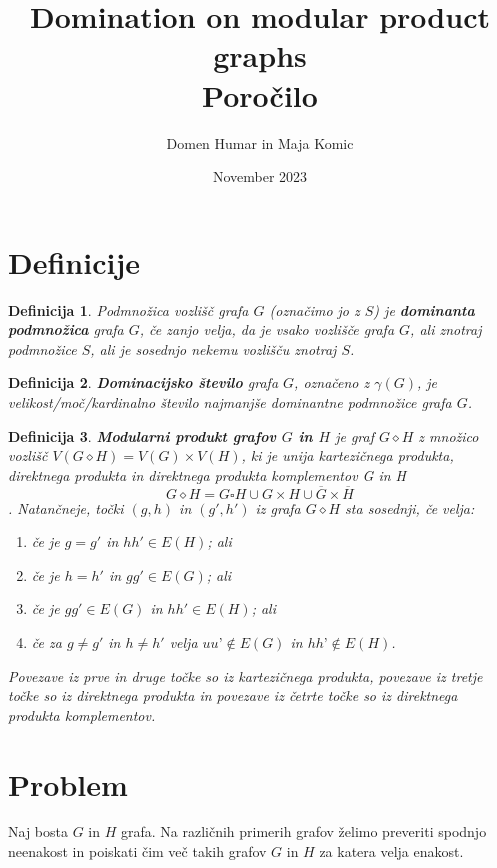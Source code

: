 \documentclass[a4paper,12pt]{article}
\newtheorem{definition}{Definicija}
\begin{document}
\author{Domen Humar in Maja Komic}
\date{November 2023}
\title{
    Domination on modular product graphs \\
    \large Poročilo
    }
\maketitle

\section{Definicije}
\begin{definition}
    Podmnožica vozlišč grafa $G$ (označimo jo z $S$) je \textbf{dominanta podmnožica}
    grafa $G$, če zanjo velja, da je vsako vozlišče grafa $G$, ali znotraj podmnožice $S$,
    ali je sosednjo nekemu vozlišču znotraj $S$.
\end{definition}

\begin{definition}
    \textbf{Dominacijsko število} grafa $G$, označeno z $\gamma(G)$, je velikost/moč/kardinalno število
    najmanjše \emph{dominantne podmnožice} grafa $G$.
\end{definition}

\begin{definition}
    \textbf {Modularni produkt grafov $G$ in $H$} je graf $G\diamond H$ z množico vozlišč $V( G\diamond H) = V(G) \times  V(H)$, ki je 
    unija kartezičnega produkta, direktnega produkta in direktnega produkta komplementov G in H
    $$G \diamond H = G\square H \cup G \times H \cup \overline{G} \times \overline{H} $$.
    Natančneje, točki $(g, h)$ in $(g', h')$ iz grafa $G \diamond H$ sta sosednji, če velja: 
    \begin{enumerate}
        \item če je $g = g'$ in $hh' \in E(H)$; ali 
        \item če je $h = h'$ in $gg' \in E(G)$; ali 
        \item če je $gg' \in E(G)$ in $hh' \in E(H)$; ali
        \item če za $g \neq g'$ in $h \neq h'$ velja $uu’ \notin  E(G)$ in $hh’ \notin  E(H)$. 
    \end{enumerate}
    Povezave iz prve in druge točke so iz kartezičnega produkta, povezave iz tretje točke so iz direktnega produkta
    in povezave iz četrte točke so iz direktnega produkta komplementov.
\end{definition}

\section{Problem}
Naj bosta $G$ in $H$ grafa.
Na različnih primerih grafov želimo preveriti 
spodnjo neenakost in poiskati čim več takih grafov $G$ in $H$ za katera velja enakost.
\end{document}

